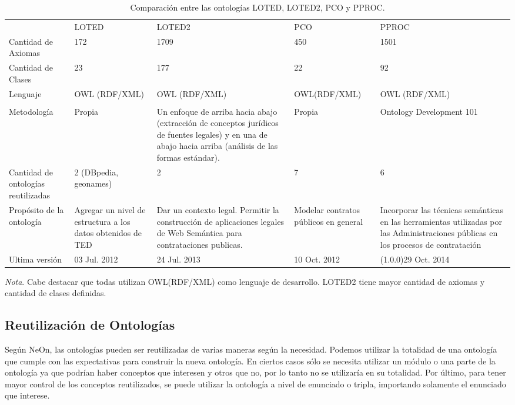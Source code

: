\begin{table}[htpb]
    \caption{Comparación entre las ontologías LOTED, LOTED2, PCO y PPROC.}
    \label{tab:comparacion_ontologias}
    
    \scriptsize 
    \begin{tabular}{L{2cm}C{3cm}C{3cm}C{2.5cm}C{3cm}}
    
     & LOTED & LOTED2 & PCO & PPROC \\
    
    
    Cantidad de Axiomas & 172 & 1709 & 450 & 1501 \\
    Cantidad de Clases & 23 & 177 & 22 & 92\\
    Lenguaje & OWL (RDF/XML) & OWL (RDF/XML) & OWL(RDF/XML) & OWL (RDF/XML)\\\\
    Metodología & Propia & 
    Un enfoque de arriba hacia abajo (extracción de conceptos jurídicos de fuentes legales) y en una de abajo hacia arriba (análisis de las formas estándar).
     & Propia & Ontology Development 101\\
    Cantidad de ontologías reutilizadas & 2 (DBpedia, geonames) & 2 & 7 & 6\\
    Propósito de la ontología & Agregar un nivel de estructura a los datos obtenidos de TED & Dar un contexto legal. Permitir la construcción de aplicaciones legales de Web Semántica para contrataciones publicas. & Modelar contratos públicos en general & Incorporar las técnicas
    semánticas en las herramientas utilizadas por las Administraciones públicas en los procesos de contratación\\
    Ultima versión & 03 Jul. 2012 & 24 Jul. 2013 & 10 Oct. 2012 & (1.0.0)29 Oct. 2014\\
    
    
    \end{tabular}
    
    \bigskip
    \small\textit{Nota}. Cabe destacar que todas utilizan OWL(RDF/XML) como lenguaje de desarrollo. LOTED2 tiene mayor cantidad de axiomas y cantidad de clases definidas.
    \end{table}

    \subsection{Reutilización de Ontologías}


    Según NeOn, las ontologías pueden ser reutilizadas de varias maneras según la necesidad. 
Podemos utilizar la totalidad de una ontología que cumple con las expectativas para construir la nueva ontología. En ciertos casos sólo se necesita utilizar un módulo o una parte de la ontología ya que podrían haber conceptos que interesen y otros que no, por lo tanto no se utilizaría en su totalidad. Por último, para tener mayor control de los conceptos reutilizados, se puede utilizar la ontología a nivel de enunciado o tripla, importando solamente el enunciado que interese. 

